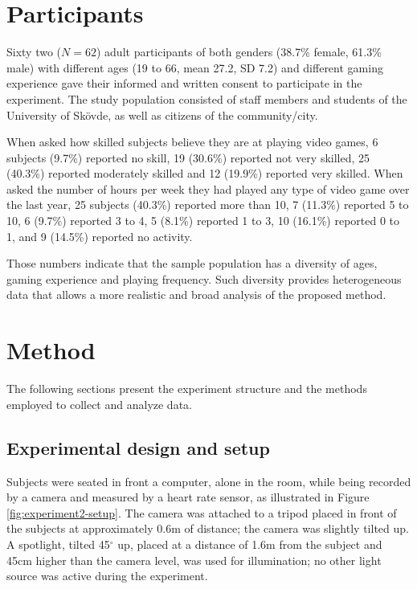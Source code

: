\section{Participants}

Sixty two ($N=62$) adult participants of both genders (38.7\% female, 61.3\% male) with different ages (19 to 66, mean 27.2, SD 7.2) and different gaming experience gave their informed and written consent to participate in the experiment. The study population consisted of staff members and students of the University of Sk\"ovde, as well as citizens of the community/city.

When asked how skilled subjects believe they are at playing video games, 6 subjects (9.7\%) reported no skill, 19 (30.6\%) reported not very skilled, 25 (40.3\%) reported moderately skilled and 12 (19.9\%) reported very skilled. When asked the number of hours per week they had played any type of video game over the last year, 25 subjects (40.3\%) reported more than 10, 7 (11.3\%) reported 5 to 10, 6 (9.7\%) reported 3 to 4, 5 (8.1\%) reported 1 to 3, 10 (16.1\%) reported 0 to 1, and 9 (14.5\%) reported no activity.

Those numbers indicate that the sample population has a diversity of ages, gaming experience and playing frequency. Such diversity provides heterogeneous data that allows a more realistic and broad analysis of the proposed method.

\section{Method}
\label{sec:experiment2-method}

The following sections present the experiment structure and the methods employed to collect and analyze data.

\subsection{Experimental design and setup}

Subjects were seated in front a computer, alone in the room, while being recorded by a camera and measured by a heart rate sensor, as illustrated in Figure \ref{fig:experiment2-setup}. The camera was attached to a tripod placed in front of the subjects at approximately 0.6m of distance; the camera was slightly tilted up. A spotlight, tilted 45$^{\circ}$ up, placed at a distance of 1.6m from the subject and 45cm higher than the camera level, was used for illumination; no other light source was active during the experiment.

